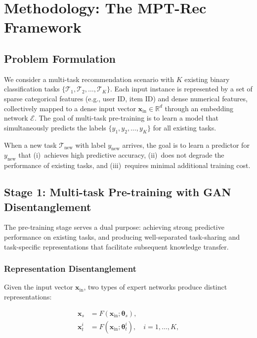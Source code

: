\documentclass[review,anonymous]{acmart}
\begin{document}
\section{Methodology: The MPT-Rec Framework}
\label{sec:method}

\subsection{Problem Formulation}

We consider a multi-task recommendation scenario with $K$ existing binary
classification tasks $\{\mathcal{T}_1, \mathcal{T}_2, \ldots, \mathcal{T}_K\}$.
Each input instance is represented by a set of sparse categorical features (e.g.,
user ID, item ID) and dense numerical features, collectively mapped to a dense
input vector $\mathbf{x}_{\text{in}} \in \mathbb{R}^d$ through an embedding
network $\mathcal{E}$. The goal of multi-task pre-training is to learn a model
that simultaneously predicts the labels $\{y_1, y_2, \ldots, y_K\}$ for all
existing tasks.

When a new task $\mathcal{T}_{\text{new}}$ with label $y_{\text{new}}$ arrives,
the goal is to learn a predictor for $y_{\text{new}}$ that (i)~achieves high
predictive accuracy, (ii)~does not degrade the performance of existing tasks, and
(iii)~requires minimal additional training cost.

\subsection{Stage 1: Multi-task Pre-training with GAN Disentanglement}

The pre-training stage serves a dual purpose: achieving strong predictive
performance on existing tasks, and producing well-separated task-sharing and
task-specific representations that facilitate subsequent knowledge transfer.

\subsubsection{Representation Disentanglement}

Given the input vector $\mathbf{x}_{\text{in}}$, two types of expert networks
produce distinct representations:

\begin{align}
  \mathbf{x}_s &= F(\mathbf{x}_{\text{in}}; \boldsymbol{\theta}_s), \label{eq:share_rep} \\
  \mathbf{x}_t^i &= F(\mathbf{x}_{\text{in}}; \boldsymbol{\theta}_t^i), \quad i = 1, \ldots, K, \label{eq:spec_rep}
\end{align}
\end{document}
